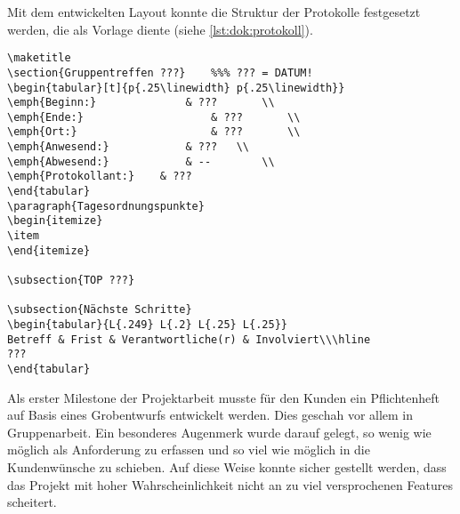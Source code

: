 Mit dem entwickelten Layout konnte die Struktur der Protokolle festgesetzt werden, die als Vorlage diente (siehe \autoref{lst:dok:protokoll}).
\begin{lstlisting}[language={[LaTeX]TeX}, label=lst:dok:protokoll, caption=Auszug der Vorlage für Protokolle]
\maketitle
\section{Gruppentreffen ???}	%%% ??? = DATUM!
\begin{tabular}[t]{p{.25\linewidth} p{.25\linewidth}}
\emph{Beginn:}				& ???		\\
\emph{Ende:}					& ???		\\
\emph{Ort:}						& ???		\\
\emph{Anwesend:}			& ???	\\
\emph{Abwesend:}			& --		\\
\emph{Protokollant:}	& ???
\end{tabular}
\paragraph{Tagesordnungspunkte}
\begin{itemize}
\item 
\end{itemize}

\subsection{TOP ???}

\subsection{Nächste Schritte}
\begin{tabular}{L{.249} L{.2} L{.25} L{.25}}
Betreff & Frist & Verantwortliche(r) & Involviert\\\hline
???
\end{tabular}
\end{lstlisting}\bigskip

Als erster Milestone der Projektarbeit musste für den Kunden ein Pflichtenheft auf Basis eines Grobentwurfs entwickelt werden. Dies geschah vor allem in Gruppenarbeit. Ein besonderes Augenmerk wurde darauf gelegt, so wenig wie möglich als Anforderung zu erfassen und so viel wie möglich in die Kundenwünsche zu schieben. Auf diese Weise konnte sicher gestellt werden, dass das Projekt mit hoher Wahrscheinlichkeit nicht an zu viel versprochenen Features scheitert. \bigskip


